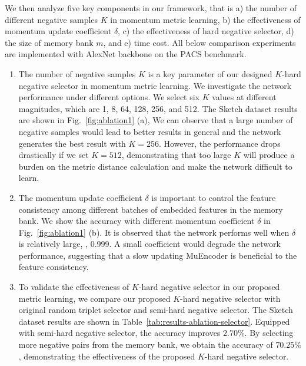 We then analyze five key components in our framework, that is a) the number of different negative samples $K$ in momentum metric learning, b) the effectiveness of momentum update coefficient $\delta$, c) the effectiveness of hard negative selector, d) the size of memory bank $m$, and e) time cost.
All below comparison experiments are implemented with AlexNet backbone on the PACS benchmark.


\renewcommand{\theenumi}{\alph{enumi}}
\begin{enumerate}
	\item The number of negative samples $K$ is a key parameter of our designed $K$-hard negative selector in momentum metric learning. 
	We investigate the network performance under different options.
	We select six $K$ values at different magnitudes, which are 1, 8, 64, 128, 256, and 512.
	The Sketch dataset results are shown in Fig.~\ref{fig:ablation1} (a), 
	We can observe that a large number of negative samples would lead to better results in general and the network generates the best result with $K=256$. 
However, the performance drops drastically if we set $K=512$, demonstrating that too large $K$ will produce a burden on the metric distance calculation and make the network difficult to learn.


	\item The momentum update coefficient $\delta$ is important to control the feature consistency among different batches of embedded features in the memory bank. 
	We show the accuracy with different momentum coefficient $\delta$ in Fig.~\ref{fig:ablation1} (b).
	It is observed that the network performs well when $\delta$ is relatively large, \ie, 0.999.
A small coefficient would degrade the network performance, suggesting that a slow updating MuEncoder is beneficial to the feature consistency.


\item To validate the effectiveness of $K$-hard negative selector in our proposed metric learning, we compare our proposed $K$-hard negative selector with original random triplet selector and semi-hard negative selector.
The Sketch dataset results are shown in Table~\ref{tab:results-ablation-selector}.
	Equipped with semi-hard negative selector, the accuracy improves $2.70\%$.
	By selecting more negative pairs from the memory bank, we obtain the accuracy of $70.25\%$, demonstrating the effectiveness of the proposed $K$-hard negative selector.
	

\end{enumerate}
